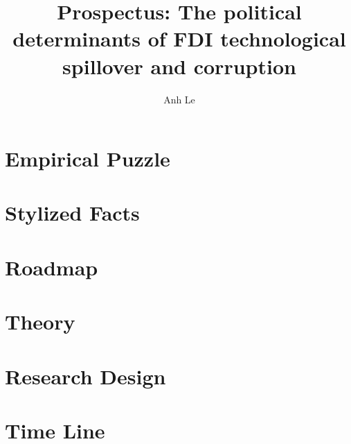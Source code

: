 \documentclass[12pt]{article}
\title{Prospectus: The political determinants of FDI technological spillover and corruption}
\author{Anh Le}
\begin{document}
\maketitle

\tableofcontents

\section{Empirical Puzzle}


\section{Stylized Facts}



\section{Roadmap}


\section{Theory}
\label{sec:theory}


\section{Research Design}
\label{sec:research_design}








\section{Time Line}
\label{sec:time_line}


\appendix


\clearpage


\end{document}
